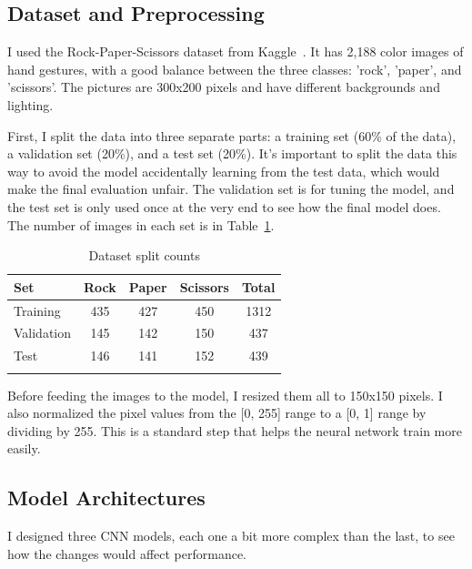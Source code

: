 \documentclass[pdflatex,sn-mathphys-num]{sn-jnl}%
\theoremstyle{thmstyleone}%
\theoremstyle{thmstyletwo}%
\theoremstyle{thmstylethree}%
\begin{document}
\subsection{Dataset and Preprocessing}
I used the Rock-Paper-Scissors dataset from Kaggle~\cite{kaggle_rps}. It has 2,188 color images of hand gestures, with a good balance between the three classes: 'rock', 'paper', and 'scissors'. The pictures are 300x200 pixels and have different backgrounds and lighting.

First, I split the data into three separate parts: a training set (60\% of the data), a validation set (20\%), and a test set (20\%). It's important to split the data this way to avoid the model accidentally learning from the test data, which would make the final evaluation unfair. The validation set is for tuning the model, and the test set is only used once at the very end to see how the final model does. The number of images in each set is in Table~\ref{tab:split}.

\begin{table}[htbp]
\caption{Dataset split counts}\label{tab:split}%
\begin{tabular}{@{}lcccc@{}}
\toprule
Set & Rock & Paper & Scissors & Total \\
\midrule
Training & 435 & 427 & 450 & 1312 \\
Validation & 145 & 142 & 150 & 437 \\
Test & 146 & 141 & 152 & 439 \\
\botrule
\end{tabular}
\end{table}

Before feeding the images to the model, I resized them all to 150x150 pixels. I also normalized the pixel values from the [0, 255] range to a [0, 1] range by dividing by 255. This is a standard step that helps the neural network train more easily.

\subsection{Model Architectures}
I designed three CNN models, each one a bit more complex than the last, to see how the changes would affect performance.
\end{document}
